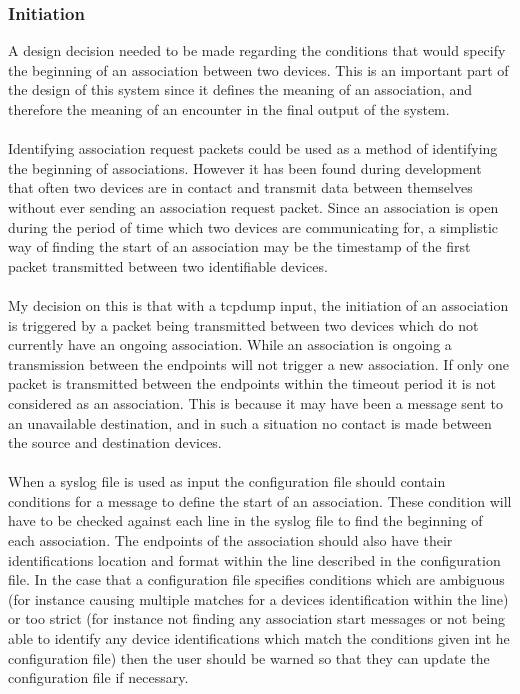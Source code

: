 \subsubsection{Initiation} 
A design decision needed to be made regarding the conditions that would specify the beginning of an association between two devices. This is an important part of the design of this system since it defines the meaning of an association, and therefore the meaning of an encounter in the final output of the system.\\\\
Identifying association request packets could be used as a method of identifying the beginning of associations. However it has been found during development that often two devices are in contact and transmit data between themselves without ever sending an association request packet. Since an association is open during the period of time which two devices are communicating for, a simplistic way of finding the start of an association may be the timestamp of the first packet transmitted between two identifiable devices.\\\\
My decision on this is that with a tcpdump input, the initiation of an association is triggered by a packet being transmitted between two devices which do not currently have an ongoing association. While an association is ongoing a transmission between the endpoints will not trigger a new association. If only one packet is transmitted between the endpoints within the timeout period it is not considered as an association. This is because it may have been a message sent to an unavailable destination, and in such a situation no contact is made between the source and destination devices.\\\\
When a syslog file is used as input the configuration file should contain conditions for a message to define the start of an association. These condition will have to be checked against each line in the syslog file to find the beginning of each association. The endpoints of the association should also have their identifications location and format within the line described in the configuration file. In the case that a configuration file specifies conditions which are ambiguous (for instance causing multiple matches for a devices identification within the line) or too strict (for instance not finding any association start messages or not being able to identify any device identifications which match the conditions given int he configuration file) then the user should be warned so that they can update the configuration file if necessary.

